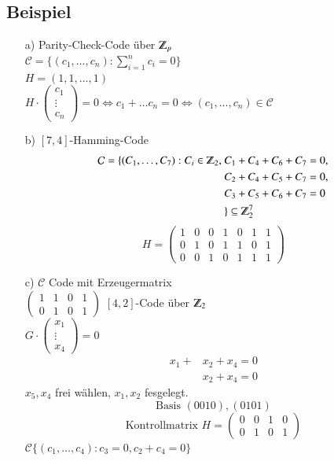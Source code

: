 \subsection{Beispiel}
\begin{itemize}
	\item [a)] Parity-Check-Code \"uber $\Z_p$ \\
	$\mathcal{C} = \lbrace (c_1,\ldots,c_n): \sum^n_{i=1}{c_i}=0 \rbrace$\\ %
	$H=(1,1,\ldots,1)$\\
	$H \cdot
	\begin{pmatrix}
	c_1 \\
	\vdots \\
	c_n
	\end{pmatrix}
	= 0 \Leftrightarrow c_1 + \ldots c_n = 0 \Leftrightarrow (c_1,\ldots,c_n) \in \mathcal{C}$
	\item [b)] $[7,4]$-Hamming-Code
	\begin{align*}
	\mathcal{C} = \lbrace (C_1,\ldots,C_7) : C_i \in \Z_2,\ &C_1 + C_4 + C_6 + C_7 = 0,\\
										&C_2 + C_4 + C_5 + C_7 = 0,\\
										&C_3 + C_5 + C_6 + C_7 = 0\\
										 &\rbrace \subseteq \Z_2^7
	\end{align*}
	\[	H=
		\begin{pmatrix}
			1 & 0 & 0 & 1 & 0 & 1 & 1\\
			0 & 1 & 0 & 1 & 1 & 0 & 1\\
			0 & 0 & 1 & 0 & 1 & 1 & 1
		\end{pmatrix}
	\]
	\item [c)] $\mathcal{C}$ Code mit Erzeugermatrix\\
	$
	\begin{pmatrix}
		1 & 1 & 0 & 1\\
		0 & 1 & 0 & 1
	\end{pmatrix}$
	 $[4,2]$-Code \"uber $\Z_2$\\
	 $G \cdot
	 \begin{pmatrix}
	 x_1 \\
	 \vdots \\
	 x_4
	 \end{pmatrix}
	 =0$
	 \begin{align*}
	 	x_1+&x_2 + x_4=0\\
	 	&x_2 + x_4 =0
	\end{align*}
	$x_5,x_4$ frei w\"ahlen, $x_1,x_2$ fesgelegt.\\
	\[
		\text{Basis }
		(0 0 1 0), (0 1 0 1)
	\]	
	\[
		\text{Kontrollmatrix }
		H=
		\begin{pmatrix}
			0 & 0 & 1 & 0 \\
			0 & 1 & 0 & 1
		\end{pmatrix}
	\]
	$\mathcal{C} \lbrace (c_1,\ldots,c_4) : c_3=0,c_2+c_4=0\rbrace$	
\end{itemize}

